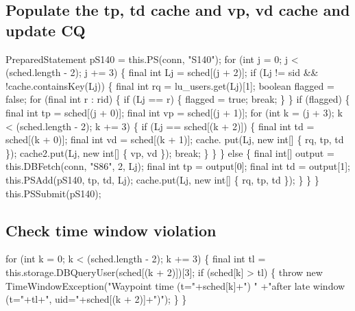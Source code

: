 \subsection{Populate the tp, td cache and vp, vd cache and update CQ}
\nwenddocs{}\endmoddef{}
PreparedStatement pS140 = this.PS(conn, "S140");
for (int j = 0; j < (sched.length - 2); j += 3) \{
  final int Lj = sched[(j + 2)];
  if (Lj != sid && !cache.containsKey(Lj)) \{
    final int rq = lu_users.get(Lj)[1];
    boolean flagged = false;
    for (final int r : rid) \{
      if (Lj == r) \{
        flagged = true;
        break;
      \}
    \}
    if (flagged) \{
      final int tp = sched[(j + 0)];
      final int vp = sched[(j + 1)];
      for (int k = (j + 3); k < (sched.length - 2); k += 3) \{
        if (Lj == sched[(k + 2)]) \{
          final int td = sched[(k + 0)];
          final int vd = sched[(k + 1)];
          cache. put(Lj, new int[] \{ rq, tp, td \});
          cache2.put(Lj, new int[] \{ vp, vd \});
          break;
        \}
      \}
    \} else \{
      final int[] output = this.DBFetch(conn, "S86", 2, Lj);
      final int tp = output[0];
      final int td = output[1];
      this.PSAdd(pS140, tp, td, Lj);
      cache.put(Lj, new int[] \{ rq, tp, td \});
    \}
  \}
\}
this.PSSubmit(pS140);
\nwendcode{}\nwdocspar

\subsection{Check time window violation}
\nwenddocs{}\endmoddef{}
for (int k = 0; k < (sched.length - 2); k += 3) \{
  final int tl = this.storage.DBQueryUser(sched[(k + 2)])[3];
  if (sched[k] > tl) \{
    throw new TimeWindowException("Waypoint time (t="+sched[k]+") "
        +"after late window (t="+tl+", uid="+sched[(k + 2)]+")");
  \}
\}
\nwendcode{}\nwdocspar


